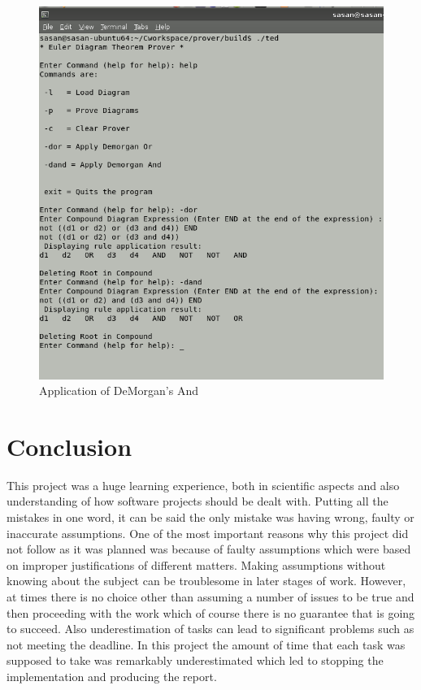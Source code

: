 \documentclass[10pt, a4paper, titlepage]{article}
\begin{document}
\begin{figure}[]
\centering
\includegraphics[scale=0.5]{images/dand.png}
\caption{Application of DeMorgan's And}
\label{fig:dand}
\end{figure}

\newpage
\newpage
\section{Conclusion}

This project was a huge learning experience, both in scientific aspects and also understanding of how software projects should be dealt with. Putting all the mistakes in one word, it can be said the only mistake was having wrong, faulty or inaccurate assumptions.  One of the most important reasons why this project did not follow as it was planned was because of faulty assumptions which were based on improper justifications of different matters. Making assumptions without knowing about the subject can be troublesome in later stages of work. However, at times there is no choice other than assuming a number of issues to be true and then proceeding with the work which of course there is no guarantee that is going to succeed. Also underestimation of tasks can lead to significant problems such as not meeting the deadline. In this project the amount of time that each task was supposed to take was remarkably underestimated which led to stopping the implementation and producing the report.\\
\end{document}
